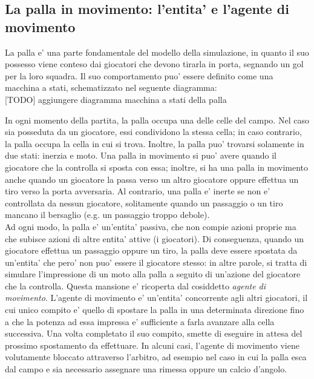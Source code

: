 \subsection*{La palla in movimento: l'entita' e l'agente di movimento}
%
\label{sec:modello_palla_agente_movimento}


La palla e' una parte fondamentale del modello della simulazione, in quanto il suo possesso viene conteso dai giocatori che devono tirarla in porta, segnando un gol per la loro squadra. Il suo comportamento puo' essere definito come una macchina a stati, schematizzato nel seguente diagramma:\\

[TODO] aggiungere diagramma macchina a stati della palla

In ogni momento della partita, la palla occupa una delle celle del campo. Nel caso sia posseduta da un giocatore, essi condividono la stessa cella; in caso contrario, la palla occupa la cella in cui si trova. Inoltre, la palla puo' trovarsi solamente in due stati: inerzia e moto. Una palla in movimento si puo' avere quando il giocatore che la controlla si sposta con essa; inoltre, si ha una palla in movimento anche quando un giocatore la passa verso un altro giocatore oppure effettua un tiro verso la porta avversaria. Al contrario, una palla e' inerte se non e' controllata da nessun giocatore, solitamente quando un passaggio o un tiro mancano il bersaglio (e.g. un passaggio troppo debole).\\

Ad ogni modo, la palla e' un'entita' passiva, che non compie azioni proprie ma che subisce azioni di altre entita' attive (i giocatori). Di conseguenza, quando un giocatore effettua un passaggio oppure un tiro, la palla deve essere spostata da un'entita' che pero' non puo' essere il giocatore stesso: in altre parole, si tratta di simulare l'impressione di un moto alla palla a seguito di un'azione del giocatore che la controlla. Questa mansione e' ricoperta dal cosiddetto \textit{agente di movimento}. L'agente di movimento e' un'entita' concorrente agli altri giocatori, il cui unico compito e' quello di spostare la palla in una determinata direzione fino a che la potenza ad essa impressa e' sufficiente a farla avanzare alla cella successiva. Una volta completato il suo compito, smette di eseguire in attesa del prossimo spostamento da effettuare. In alcuni casi, l'agente di movimento viene volutamente bloccato attraverso l'arbitro, ad esempio nel caso in cui la palla esca dal campo e sia necessario assegnare una rimessa oppure un calcio d'angolo.

